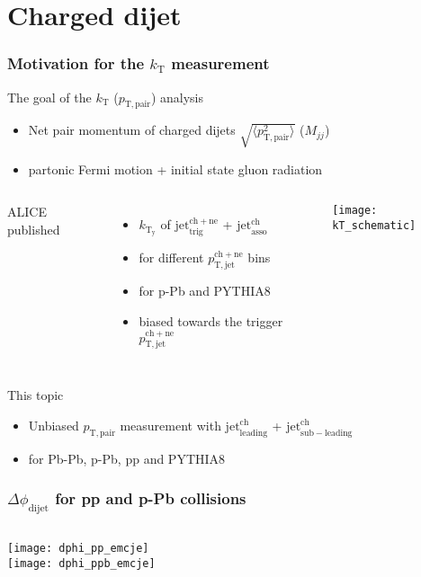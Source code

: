 

\section{Charged dijet}


\begin{frame}
\frametitle{Motivation for the $k_\mathrm{T}$ measurement}
The goal of the $k_\mathrm{T}$ ($p_\mathrm{T,pair}$) analysis

\begin{itemize}
	\item {Net pair momentum of charged dijets $\sqrt{\langle p^2_\mathrm{T,pair} \rangle}$ ($M_{jj}$) }
	\item{partonic Fermi motion + initial state gluon radiation}
\end{itemize}
\begin{columns}
ALICE published
\begin{itemize}
	\item{$k_\mathrm{T_y}$ of $\mathrm{{jet}_{trig}^{ch+ne}}$ +  $\mathrm{{jet}_{asso}^{ch}}$}
	\item{for different $p_\mathrm{T,jet}^\mathrm{ch+ne}$ bins}
	\item{for p-Pb  and PYTHIA8}
	\item{biased towards the trigger $p_\mathrm{T,jet}^\mathrm{ch+ne}$ }
\end{itemize}
\texttt{[image: kT\_schematic]}
\end{columns}
This topic
\begin{itemize}
	\item{Unbiased $p_\mathrm{T,pair}$ measurement with $\mathrm{{jet}_{leading}^{ch}}$ +  $\mathrm{{jet}_{sub-leading}^{ch}}$}
	\item{for Pb-Pb, p-Pb, pp and PYTHIA8}
\end{itemize}
\end{frame}

\begin{frame}
\frametitle{$\Delta \phi_\mathrm{dijet}$ for pp and p-Pb collisions}
\begin{columns}[t]
\centering
\texttt{[image: dphi\_pp\_emcje]}\\
\texttt{[image: dphi\_ppb\_emcje]}\\
\end{columns}
\end{frame}

